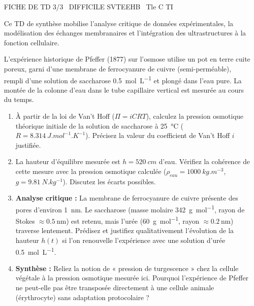 \documentclass[11pt]{article}
\begin{document}
\begin{tcolorbox}[enhanced,colback=popink,colframe=popink,arc=10pt,boxrule=0pt,left=12pt,right=12pt,top=9pt,bottom=9pt]
{\color{white}\popxbold\small FICHE DE TD 3/3 \textbullet\ DIFFICILE \hfill SVTEEHB \textbullet\ Tle C TI\par}
\end{tcolorbox}
\vspace{4pt}
Ce TD de synthèse mobilise l'analyse critique de données expérimentales, la modélisation des échanges membranaires et l'intégration des ultrastructures à la fonction cellulaire.

\begin{exercice}
L'expérience historique de Pfeffer (1877) sur l'osmose utilise un pot en terre cuite poreux, garni d'une membrane de ferrocyanure de cuivre (semi-perméable), rempli d'une solution de saccharose \SI{0,5}{mol.L^{-1}} et plongé dans l'eau pure. La montée de la colonne d'eau dans le tube capillaire vertical est mesurée au cours du temps.

\begin{enumerate}
    \item À partir de la loi de Van't Hoff ($\Pi = i C R T$), calculez la pression osmotique théorique initiale de la solution de saccharose à \SI{25}{\celsius} ($R = \SI{8,314}{J.mol^{-1}.K^{-1}}$). Précisez la valeur du coefficient de Van't Hoff $i$ justifiée.
    \item La hauteur d'équilibre mesurée est $h = \SI{520}{cm}$ d'eau. Vérifiez la cohérence de cette mesure avec la pression osmotique calculée ($\rho_{eau} = \SI{1000}{kg.m^{-3}}$, $g = \SI{9,81}{N.kg^{-1}}$). Discutez les écarts possibles.
    \item \textbf{Analyse critique :} La membrane de ferrocyanure de cuivre présente des pores d'environ \SI{1}{\nano\meter}. Le saccharose (masse molaire \SI{342}{g.mol^{-1}}, rayon de Stokes $\approx \SI{0,5}{\nano\meter}$) est retenu, mais l'urée (\SI{60}{g.mol^{-1}}, rayon $\approx \SI{0,2}{\nano\meter}$) traverse lentement. Prédisez et justifiez qualitativement l'évolution de la hauteur $h(t)$ si l'on renouvelle l'expérience avec une solution d'urée \SI{0,5}{mol.L^{-1}}.
    \item \textbf{Synthèse :} Reliez la notion de « pression de turgescence » chez la cellule végétale à la pression osmotique mesurée ici. Pourquoi l'expérience de Pfeffer ne peut-elle pas être transposée directement à une cellule animale (érythrocyte) sans adaptation protocolaire ?
\end{enumerate}
\end{exercice}
\end{document}
